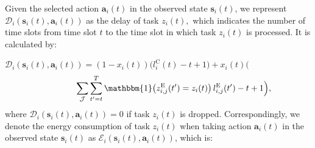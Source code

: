 \documentclass[10pt, journal,letterpaper]{IEEEtran}
\begin{document}
	
 Given the selected action $\boldsymbol{a}_i(t)$ in the observed state $\boldsymbol{s}_i(t)$, we represent $\mathcal{D}_i(\boldsymbol{s}_i(t), \boldsymbol{a}_i(t))$ as the delay of task $z_i(t),$ which indicates the number of time slots from time slot $t$ to the time slot in which task $z_i(t)$ is processed. It is calculated by: \vspace{2mm}

$\mathcal{D}_i(\boldsymbol{s}_i(t),\boldsymbol{a}_i(t)) = (1-x_i(t))\Big(l_i^{\text{C}}(t) - t + 1\Big)  +  x_i(t) \Big($
\begin{alignat}{1}
	\hspace{1.3cm} \sum\limits_{\mathcal{J}} \sum\limits_{t'=t}^{T} \mathbbm{1}\big(z_{i,j}^{\text{E}}(t') = z_i(t)\big)\, l_{i,j}^{\text{E}}(t') - t +1\Big),
	\label{21}  
\end{alignat} 
where $\mathcal{D}_i(\boldsymbol{s}_i(t),\boldsymbol{a}_i(t))= 0$ if task $z_i(t)$ is dropped. Correspondingly, we denote the energy consumption of task $z_i(t)$ when taking action $\boldsymbol{a}_i(t)$ in the observed state $\boldsymbol{s}_i(t)$ as $\mathcal{E}_i(\boldsymbol{s}_i(t),\boldsymbol{a}_i(t))$, which is: \vspace{1.7mm}
\end{document}
